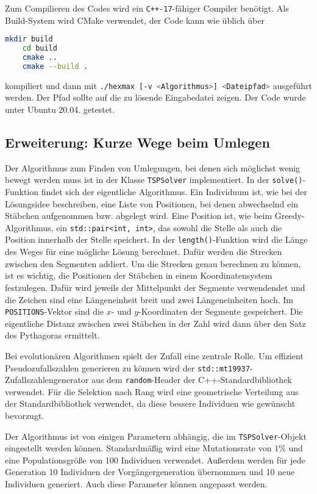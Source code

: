 \documentclass[a4paper,10pt,ngerman]{scrartcl}
\begin{document}
Zum Compilieren des Codes wird ein \texttt{C++-17}-fähiger Compiler benötigt.
Als Build-System wird CMake verwendet, der Code kann wie üblich über 
\begin{lstlisting}[language=bash]
    mkdir build
    cd build
    cmake ..
    cmake --build . 
\end{lstlisting}    
kompiliert und dann mit \lstinline[language=bash]{./hexmax [-v <Algorithmus>] <Dateipfad>} ausgeführt werden. Der Pfad sollte auf die zu lösende Eingabedatei zeigen. Der Code wurde unter Ubuntu 20.04. getestet.

\subsection{Erweiterung: Kurze Wege beim Umlegen}
Der Algorithmus zum Finden von Umlegungen, bei denen sich möglichst wenig bewegt werden muss ist in der Klasse \lstinline{TSPSolver} implementiert. In der \lstinline{solve()}-Funktion findet sich der eigentliche Algorithmus. 
Ein Individuum ist, wie bei der Lösungsidee beschreiben, eine Liste von Positionen, bei denen abwechselnd ein Stäbchen aufgenommen bzw. abgelegt wird. 
Eine Position ist, wie beim Greedy-Algorithmus, ein \lstinline{std::pair<int, int>}, das sowohl die Stelle als auch die Position innerhalb der Stelle speichert. 
In der \lstinline{length()}-Funktion wird die Länge des Weges für eine mögliche Lösung berechnet. 
Dafür werden die Strecken zwischen den Segmenten addiert. 
Um die Strecken genau berechnen zu können, ist es wichtig, die Positionen der Stäbchen in einem Koordinatensystem festzulegen. 
Dafür wird jeweils der Mittelpunkt der Segmente verwendendet und die Zeichen sind eine Längeneinheit breit und zwei Längeneinheiten hoch.
Im \lstinline{POSITIONS}-Vektor sind die $x$- und $y$-Koordinaten der Segmente gespeichert. 
Die eigentliche Distanz zwischen zwei Stäbchen in der Zahl wird dann über den Satz des Pythagoras ermittelt. 

Bei evolutionären Algorithmen spielt der Zufall eine zentrale Rolle. 
Um effizient Pseudozufallszahlen generieren zu können wird der \lstinline{std::mt19937}-Zufallszahlengenerator aus dem \lstinline{random}-Header der C++-Standardbibliothek verwendet. 
Für die Selektion nach Rang wird eine geometrische Verteilung aus der Standardbibliothek verwendet, da diese bessere Individuen wie gewünscht bevorzugt.

Der Algorithmus ist von einigen Parametern abhängig, die im \lstinline{TSPSolver}-Objekt eingestellt werden können. 
Standardmäßig wird eine Mutationsrate von $1\%$ und eine Populationsgröße von 100 Individuen verwendet. 
Außerdem werden für jede Generation 10 Individuen der Vorgängergeneration übernommen und 10 neue Individuen generiert. Auch diese Parameter können angepasst werden. 
\end{document}
